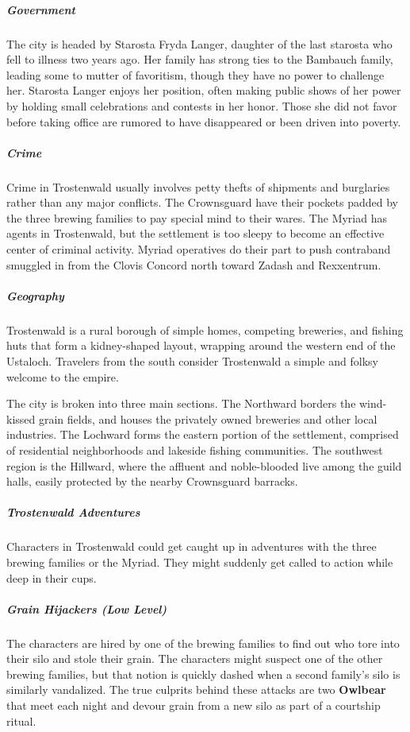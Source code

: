 \documentclass[10pt,a4paper,twoside,bg=print,twocolumn,openany,nodeprecatedcode]{dndbook}
\begin{document}
\subparagraph{Government}
The city is headed by Starosta Fryda Langer, daughter of the last starosta who fell to illness two years ago. Her family has strong ties to the Bambauch family, leading some to mutter of favoritism, though they have no power to challenge her. Starosta Langer enjoys her position, often making public shows of her power by holding small celebrations and contests in her honor. Those she did not favor before taking office are rumored to have disappeared or been driven into poverty.

\subparagraph{Crime}
Crime in Trostenwald usually involves petty thefts of shipments and burglaries rather than any major conflicts. The Crownsguard have their pockets padded by the three brewing families to pay special mind to their wares. The Myriad has agents in Trostenwald, but the settlement is too sleepy to become an effective center of criminal activity. Myriad operatives do their part to push contraband smuggled in from the Clovis Concord north toward Zadash and Rexxentrum.

\subparagraph{Geography}
Trostenwald is a rural borough of simple homes, competing breweries, and fishing huts that form a kidney-shaped layout, wrapping around the western end of the Ustaloch. Travelers from the south consider Trostenwald a simple and folksy welcome to the empire.

The city is broken into three main sections. The Northward borders the wind-kissed grain fields, and houses the privately owned breweries and other local industries. The Lochward forms the eastern portion of the settlement, comprised of residential neighborhoods and lakeside fishing communities. The southwest region is the Hillward, where the affluent and noble-blooded live among the guild halls, easily protected by the nearby Crownsguard barracks.

\subparagraph{Trostenwald Adventures}
Characters in Trostenwald could get caught up in adventures with the three brewing families or the Myriad. They might suddenly get called to action while deep in their cups.

\subparagraph{Grain Hijackers (Low Level)}
The characters are hired by one of the brewing families to find out who tore into their silo and stole their grain. The characters might suspect one of the other brewing families, but that notion is quickly dashed when a second family's silo is similarly vandalized. The true culprits behind these attacks are two \textbf{Owlbear} that meet each night and devour grain from a new silo as part of a courtship ritual.
\end{document}
